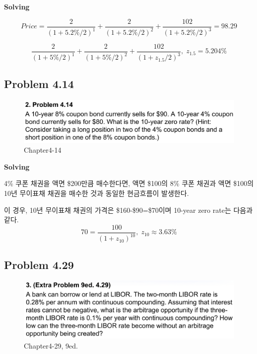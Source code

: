 \documentclass[
  letterpaper,
  DIV=11,
  numbers=noendperiod]{scrreprt}
\begin{document}
\textbf{Solving}

\[Price=\frac{2}{(1+5.2\%/2)^{1}}+\frac{2}{(1+5.2\%/2)^{2}}+\frac{102}{(1+5.2\%/2)^{3}}=98.29\]

\[\frac{2}{(1+5\%/2)^{1}}+\frac{2}{(1+5\%/2)^{2}}+\frac{102}{(1+z_{1.5}/2)^{3}},\;z_{1.5}=5.204\%\]

\subsection*{\texorpdfstring{\textbf{Problem
4.14}}{Problem 4.14}}\label{problem-4.14}

\begin{figure}[H]

{\centering \includegraphics{images/선물옵션_4-14.png}

}

\caption{Chapter4-14}

\end{figure}%

\textbf{Solving}

4\% 쿠폰 채권을 액면 \$200만큼 매수한다면, 액면 \$100의 8\% 쿠폰 채권과
액면 \$100의 10년 무이표채 채권을 매수한 것과 동일한 현금흐름이
발생한다.

이 경우, 10년 무이표채 채권의 가격은 \$160-\$90=\$70이며 10-year zero
rate는 다음과 같다.
\[70=\frac{100}{(1+z_{10})^{10}},\;z_{10}\approx 3.63\%\]

\subsection*{\texorpdfstring{\textbf{Problem
4.29}}{Problem 4.29}}\label{problem-4.29}

\begin{figure}[H]

{\centering \includegraphics{images/선물옵션_4-29.png}

}

\caption{Chapter4-29, 9ed.}

\end{figure}%
\end{document}
